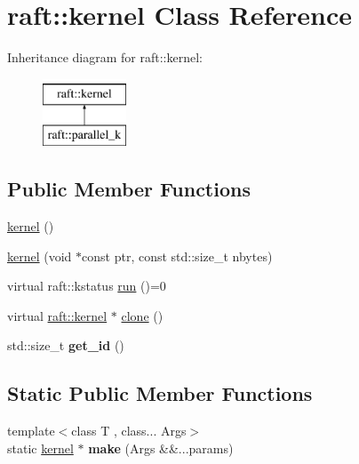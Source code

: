 \hypertarget{classraft_1_1kernel}{}\section{raft\+:\+:kernel Class Reference}
\label{classraft_1_1kernel}
Inheritance diagram for raft\+:\+:kernel\+:\begin{figure}[H]
\begin{center}
\leavevmode
\includegraphics[height=2.000000cm]{classraft_1_1kernel}
\end{center}
\end{figure}
\subsection*{Public Member Functions}
\begin{DoxyCompactItemize}
\item 
\hyperlink{classraft_1_1kernel_a57aa6c7842f594d1522fb1c127fc4588}{kernel} ()
\item 
\hyperlink{classraft_1_1kernel_a8c275f04f04b99d77fc4639a053112c8}{kernel} (void $\ast$const ptr, const std\+::size\+\_\+t nbytes)
\item 
virtual raft\+::kstatus \hyperlink{classraft_1_1kernel_a05094286d7577360fb1b91c91fc05901}{run} ()=0
\item 
virtual \hyperlink{classraft_1_1kernel}{raft\+::kernel} $\ast$ \hyperlink{classraft_1_1kernel_a71bfffbbb3d40949e19be32e3d8f467f}{clone} ()
\item 
\hypertarget{classraft_1_1kernel_a2376ee5c5d413955db3f017fb707a6df}{}std\+::size\+\_\+t {\bfseries get\+\_\+id} ()\label{classraft_1_1kernel_a2376ee5c5d413955db3f017fb707a6df}

\end{DoxyCompactItemize}
\subsection*{Static Public Member Functions}
\begin{DoxyCompactItemize}
\item 
\hypertarget{classraft_1_1kernel_adc0c9673065432e5613cc424ae44ddc6}{}{\footnotesize template$<$class T , class... Args$>$ }\\static \hyperlink{classraft_1_1kernel}{kernel} $\ast$ {\bfseries make} (Args \&\&...params)\label{classraft_1_1kernel_adc0c9673065432e5613cc424ae44ddc6}

\end{DoxyCompactItemize}

